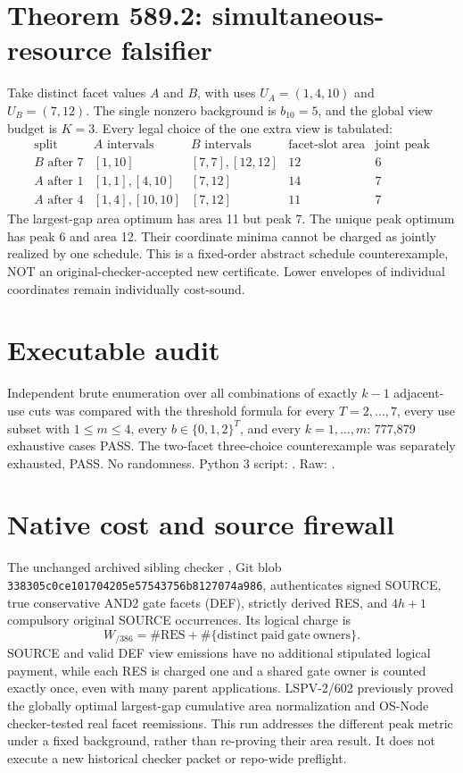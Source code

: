 \documentclass[11pt]{article}
\begin{document}
\section*{Theorem 589.2: simultaneous-resource falsifier}
Take distinct facet values $A$ and $B$, with uses $U_A=(1,4,10)$ and $U_B=(7,12)$. The single nonzero background is $b_{10}=5$, and the global view budget is $K=3$. Every legal choice of the one extra view is tabulated:
\[
\begin{array}{c|c|c|r|r}
\text{split}&A\text{ intervals}&B\text{ intervals}&
\text{facet-slot area}&\text{joint peak}\\ \hline
B\text{ after 7}&[1,10]&[7,7],[12,12]&12&6\\
A\text{ after 1}&[1,1],[4,10]&[7,12]&14&7\\
A\text{ after 4}&[1,4],[10,10]&[7,12]&11&7
\end{array}
\]
The largest-gap area optimum has area 11 but peak 7. The unique peak optimum has peak 6 and area 12. Their coordinate minima cannot be charged as jointly realized by one schedule. This is a fixed-order abstract schedule counterexample, NOT an original-checker-accepted new certificate. Lower envelopes of individual coordinates remain individually cost-sound.

\section*{Executable audit}
Independent brute enumeration over all combinations of exactly $k-1$ adjacent-use cuts was compared with the threshold formula for every $T=2,\ldots,7$, every use subset with $1\le m\le4$, every $b\in\{0,1,2\}^T$, and every $k=1,\ldots,m$: 777,879 exhaustive cases PASS. The two-facet three-choice counterexample was separately exhausted, PASS. No randomness. Python 3 script: . Raw: .

\section*{Native cost and source firewall}
The unchanged archived sibling checker , Git blob \texttt{338305c0ce101704205e57543756b8127074a986}, authenticates signed SOURCE, true conservative AND2 gate facets (DEF), strictly derived RES, and $4h+1$ compulsory original SOURCE occurrences. Its logical charge is
\[
W_{\mathrm{/386}}=\#\mathrm{RES}+\#\{\mathrm{distinct\ paid\ gate\ owners}\}.
\]
SOURCE and valid DEF view emissions have no additional stipulated logical payment, while each RES is charged one and a shared gate owner is counted exactly once, even with many parent applications. LSPV-2/602 previously proved the globally optimal largest-gap cumulative area normalization and OS-Node checker-tested real facet reemissions. This run addresses the different peak metric under a fixed background, rather than re-proving their area result. It does not execute a new historical checker packet or repo-wide preflight.
\end{document}
